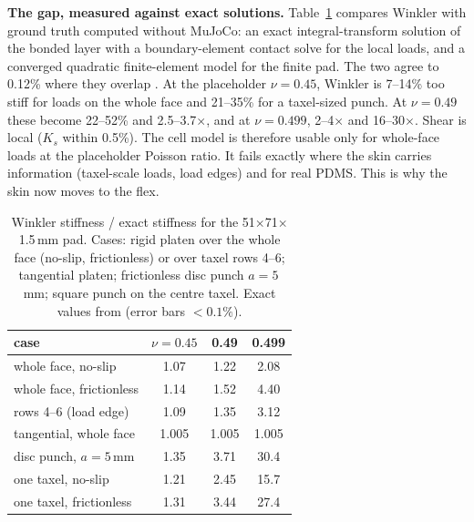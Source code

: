 \documentclass[10pt,twocolumn]{article}
\begin{document}
\textbf{The gap, measured against exact solutions.} Table~\ref{tab:gap} compares Winkler with ground truth
computed without MuJoCo: an exact integral-transform solution of the bonded layer with a boundary-element contact
solve for the local loads, and a converged quadratic finite-element model for the finite pad. The two agree to
0.12\% where they overlap \cite{flexstudy}. At the placeholder $\nu=0.45$, Winkler is 7--14\% too stiff for loads
on the whole face and 21--35\% for a taxel-sized punch. At $\nu=0.49$ these become 22--52\% and 2.5--3.7$\times$,
and at $\nu=0.499$, 2--4$\times$ and 16--30$\times$. Shear is local ($K_s$ within 0.5\%). The cell model is
therefore usable only for whole-face loads at the placeholder Poisson ratio. It fails exactly where the skin carries
information (taxel-scale loads, load edges) and for real PDMS. This is why the skin now moves to the flex.

\begin{table}[t]\centering\footnotesize
\caption{Winkler stiffness / exact stiffness for the 51$\times$71$\times$1.5\,mm pad. Cases: rigid platen over the
whole face (no-slip, frictionless) or over taxel rows 4--6; tangential platen; frictionless disc punch $a=5$\,mm;
square punch on the centre taxel. Exact values from \cite{flexstudy} (error bars $<0.1\%$).}
\label{tab:gap}\setlength{\tabcolsep}{3pt}
\begin{tabular}{@{}lccc@{}}\toprule
case & $\nu=0.45$ & 0.49 & 0.499\\\midrule
whole face, no-slip & 1.07 & 1.22 & 2.08\\
whole face, frictionless & 1.14 & 1.52 & 4.40\\
rows 4--6 (load edge) & 1.09 & 1.35 & 3.12\\
tangential, whole face & 1.005 & 1.005 & 1.005\\
disc punch, $a=5$\,mm & 1.35 & 3.71 & 30.4\\
one taxel, no-slip & 1.21 & 2.45 & 15.7\\
one taxel, frictionless & 1.31 & 3.44 & 27.4\\\bottomrule
\end{tabular}
\end{table}
\end{document}
